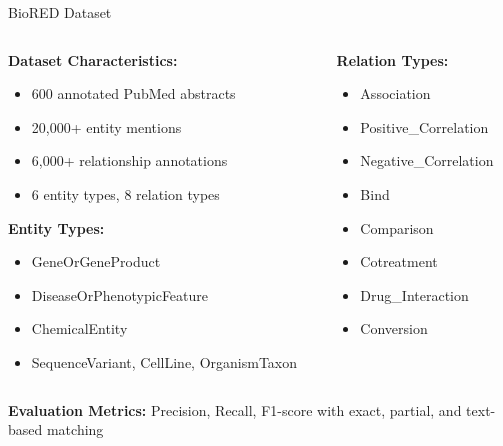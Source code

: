 \documentclass[aspectratio=169, 11pt]{beamer}
\begin{document}
\begin{frame}{BioRED Dataset}
    \vspace{0.3cm}
    \begin{columns}[T]
        \begin{column}{0.6\textwidth}
            \textbf{Dataset Characteristics:}
            \begin{itemize}
                \setlength{\itemsep}{0.2cm}
                \item 600 annotated PubMed abstracts
                \item 20,000+ entity mentions
                \item 6,000+ relationship annotations
                \item 6 entity types, 8 relation types
            \end{itemize}
            
            \vspace{0.4cm}
            \textbf{Entity Types:}
            \begin{itemize}
                \setlength{\itemsep}{0.15cm}
                \item GeneOrGeneProduct
                \item DiseaseOrPhenotypicFeature
                \item ChemicalEntity
                \item SequenceVariant, CellLine, OrganismTaxon
            \end{itemize}
        \end{column}
        \begin{column}{0.4\textwidth}
            \textbf{Relation Types:}
            \begin{itemize}
                \setlength{\itemsep}{0.15cm}
                \item Association
                \item Positive\_Correlation
                \item Negative\_Correlation
                \item Bind
                \item Comparison
                \item Cotreatment
                \item Drug\_Interaction
                \item Conversion
            \end{itemize}
        \end{column}
    \end{columns}
    
    \vspace{0.6cm}
    \textbf{Evaluation Metrics:} Precision, Recall, F1-score with exact, partial, and text-based matching
\end{frame}
\end{document}

